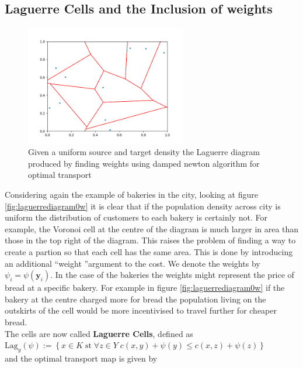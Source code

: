 \subsection{Laguerre Cells and the Inclusion of weights}
 \begin{figure}[h]
	\centering
	\includegraphics[width=7cm]{project/laguerre_diagram_OTw}
	\caption[Laguerre diagram produced by finding weights using damped newton algorithm for optimal transport]{Given a uniform source and target density the Laguerre diagram produced by finding weights using damped newton algorithm for optimal transport}
	\label{fig:laguerrediagramotw}
\end{figure}
Considering again the example of bakeries in the city, looking at figure \ref{fig:laguerrediagram0w} it is clear that if the population density across city is uniform the distribution of customers to each bakery is certainly not. For example, the Voronoi cell at the centre of the diagram is much larger in area than those in the top right of the diagram. This raises the problem of finding a way to create a partion so that each cell has the same area. This is done by introducing an additional \textquotedblleft weight \textquotedblright  argument to the cost. We denote the weights by $\psi_i = \psi\left(\bm{y}_i\right)$. In the case of the bakeries the weights might represent the price of bread at a specific bakery. For example in figure \ref{fig:laguerrediagram0w} if the bakery at the centre charged more for bread the population living on the outskirts of the cell would be more incentivised to travel further for cheaper bread.\\
\linebreak
The cells are now called  \textbf{Laguerre Cells}, defined as \\ $\text{Lag}_y(\psi) := \left\lbrace x \in K \; \text{st} \; \forall z \in Y \; c(x,y) + \psi(y) \leq c(x,z) + \psi(z) \right\rbrace$ \\ and the optimal transport map is given by \\
